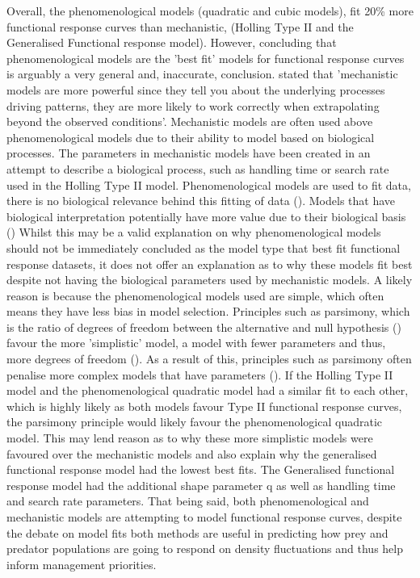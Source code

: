 \documentclass[11pt]{article}
\begin{document}
Overall, the phenomenological models (quadratic and cubic models), fit 20\% more functional response curves than mechanistic, (Holling Type II and the Generalised Functional response model). However, concluding that phenomenological models are the 'best fit' models for functional response curves is arguably a very general and, inaccurate, conclusion. \cite{Bolker2008} stated that 'mechanistic models are more powerful since they tell you about the underlying processes driving patterns, they are more likely to work correctly when extrapolating beyond the observed conditions'. Mechanistic models are often used above phenomenological models due to their ability to model based on biological processes. The parameters in mechanistic models have been created in an attempt to describe a biological process, such as handling time or search rate used in the Holling Type II model. Phenomenological models are used to fit data, there is no biological relevance behind this fitting of data (\cite{Hilborn1997}). Models that have biological interpretation potentially have more value due to their biological basis (\cite{Johnson2004})  \newline
Whilst this may be a valid explanation on why phenomenological models should not be immediately concluded as the model type that best fit functional response datasets, it does not offer an explanation as to why these models fit best despite not having the biological parameters used by mechanistic models. A likely reason is because the phenomenological models used are simple, which often means they have less bias in model selection. Principles such as parsimony, which is the ratio of degrees of freedom between the alternative and null hypothesis (\cite{Marsh1998}) favour the more 'simplistic' model, a model with fewer parameters and thus, more degrees of freedom (\cite{Mulaik1998}). As a result of this, principles such as parsimony often penalise more complex models that have parameters (\cite{Raykov1999}). If the Holling Type II model and the phenomenological quadratic model had a similar fit to each other, which is highly likely as both models favour Type II functional response curves, the parsimony principle would likely favour the phenomenological quadratic model. This may lend reason as to why these more simplistic models were favoured over the mechanistic models and also explain why the generalised functional response model had the lowest best fits. The Generalised functional response model had the additional shape parameter q as well as handling time and search rate parameters. That being said, both phenomenological and mechanistic models are attempting to model functional response curves, despite the debate on model fits both methods are useful in predicting how prey and predator populations are going to respond on density fluctuations and thus help inform management priorities. 
\end{document}
